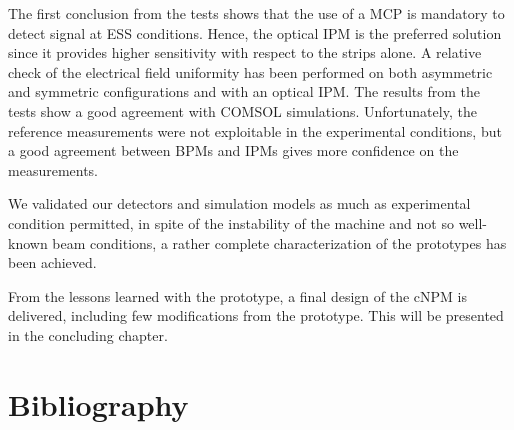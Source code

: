 \begin{refsection}
  The first conclusion from the tests shows that the use of a MCP is mandatory to detect signal at ESS conditions. Hence, the optical IPM is the preferred solution since it provides higher sensitivity with respect to the strips alone. A relative check of the electrical field uniformity has been performed on both asymmetric and symmetric configurations and with an optical IPM. The results from the tests show a good agreement with COMSOL simulations.
  Unfortunately, the reference measurements were not exploitable in the experimental conditions, but a good agreement between BPMs and IPMs gives more confidence on the measurements.

  We validated our detectors and simulation models as much as experimental condition permitted, in spite of the instability of the machine and not so well-known beam conditions, a rather complete characterization of the prototypes has been achieved.

  From the lessons learned with the prototype, a final design of the cNPM is delivered, including few modifications from the prototype. This will be presented in the concluding chapter.

  \cleardoublepage
  \section{Bibliography}
  \label{ch4:bib}
  \printbibliography[heading=subbibliography]

\end{refsection}
